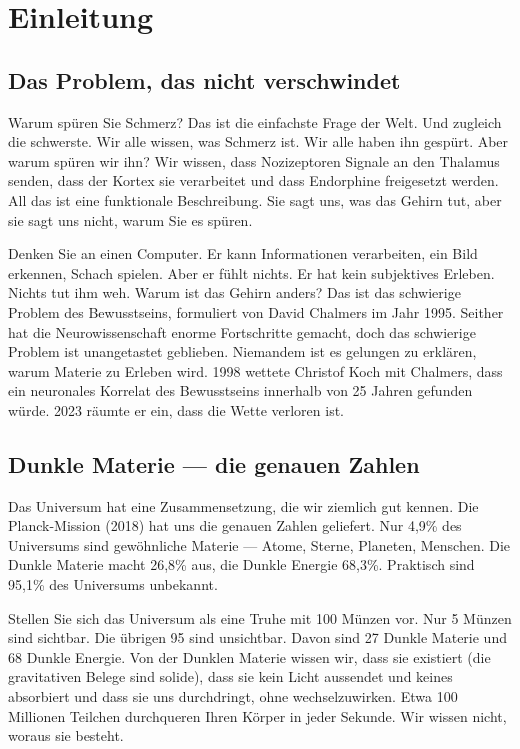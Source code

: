 \section{Einleitung}

\subsection{Das Problem, das nicht verschwindet}
Warum spüren Sie Schmerz? Das ist die einfachste Frage der Welt. Und zugleich die schwerste. Wir alle wissen, was Schmerz ist. Wir alle haben ihn gespürt. Aber warum spüren wir ihn? Wir wissen, dass Nozizeptoren Signale an den Thalamus senden, dass der Kortex sie verarbeitet und dass Endorphine freigesetzt werden. All das ist eine funktionale Beschreibung. Sie sagt uns, was das Gehirn tut, aber sie sagt uns nicht, warum Sie es spüren.

Denken Sie an einen Computer. Er kann Informationen verarbeiten, ein Bild erkennen, Schach spielen. Aber er fühlt nichts. Er hat kein subjektives Erleben. Nichts tut ihm weh. Warum ist das Gehirn anders? Das ist das schwierige Problem des Bewusstseins, formuliert von David Chalmers im Jahr 1995. Seither hat die Neurowissenschaft enorme Fortschritte gemacht, doch das schwierige Problem ist unangetastet geblieben. Niemandem ist es gelungen zu erklären, warum Materie zu Erleben wird. 1998 wettete Christof Koch mit Chalmers, dass ein neuronales Korrelat des Bewusstseins innerhalb von 25 Jahren gefunden würde. 2023 räumte er ein, dass die Wette verloren ist.

\subsection{Dunkle Materie --- die genauen Zahlen}
Das Universum hat eine Zusammensetzung, die wir ziemlich gut kennen. Die Planck-Mission (2018) hat uns die genauen Zahlen geliefert. Nur 4,9\% des Universums sind gewöhnliche Materie --- Atome, Sterne, Planeten, Menschen. Die Dunkle Materie macht 26,8\% aus, die Dunkle Energie 68,3\%. Praktisch sind 95,1\% des Universums unbekannt.

Stellen Sie sich das Universum als eine Truhe mit 100 Münzen vor. Nur 5 Münzen sind sichtbar. Die übrigen 95 sind unsichtbar. Davon sind 27 Dunkle Materie und 68 Dunkle Energie. Von der Dunklen Materie wissen wir, dass sie existiert (die gravitativen Belege sind solide), dass sie kein Licht aussendet und keines absorbiert und dass sie uns durchdringt, ohne wechselzuwirken. Etwa 100 Millionen Teilchen durchqueren Ihren Körper in jeder Sekunde. Wir wissen nicht, woraus sie besteht.

